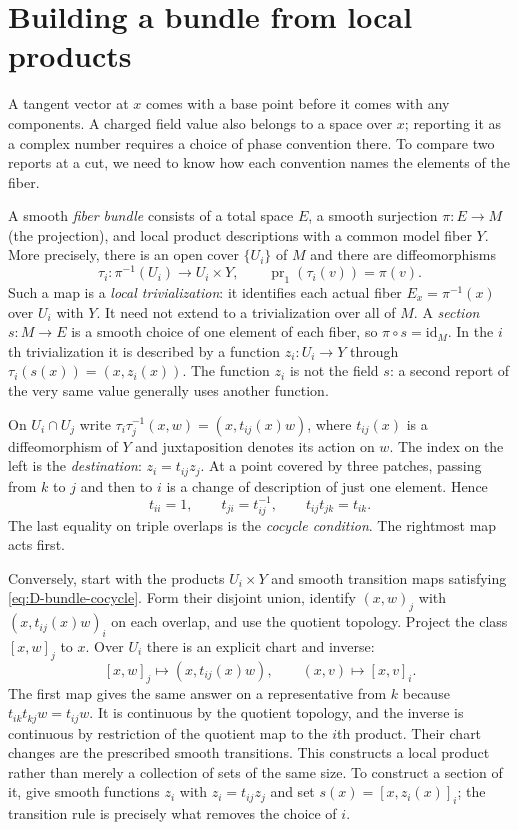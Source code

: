 \section{Building a bundle from local products}\label{sec:D-bundles}

A tangent vector at $x$ comes with a base point before it comes with any components. A charged field value also belongs to a space over $x$; reporting it as a complex number requires a choice of phase convention there. To compare two reports at a cut, we need to know how each convention names the elements of the fiber.

A smooth \emph{fiber bundle} consists of a total space $E$, a smooth surjection $\pi:E\to M$ (the projection), and local product descriptions with a common model fiber $Y$. More precisely, there is an open cover $\{U_i\}$ of $M$ and there are diffeomorphisms
\[
 \tau_i:\pi^{-1}(U_i)\longrightarrow U_i\times Y,
 \qquad \operatorname{pr}_1(\tau_i(v))=\pi(v) .
\]
Such a map is a \emph{local trivialization}: it identifies each actual fiber $E_x=\pi^{-1}(x)$ over $U_i$ with $Y$. It need not extend to a trivialization over all of $M$. A \emph{section} $s:M\to E$ is a smooth choice of one element of each fiber, so $\pi\circ s=\mathrm{id}_M$. In the $i$th trivialization it is described by a function $z_i:U_i\to Y$ through $\tau_i(s(x))=(x,z_i(x))$. The function $z_i$ is not the field $s$: a second report of the very same value generally uses another function.

On $U_i\cap U_j$ write $\tau_i\tau_j^{-1}(x,w)=(x,t_{ij}(x)w)$, where $t_{ij}(x)$ is a diffeomorphism of $Y$ and juxtaposition denotes its action on $w$. The index on the left is the \emph{destination}: $z_i=t_{ij}z_j$. At a point covered by three patches, passing from $k$ to $j$ and then to $i$ is a change of description of just one element. Hence
\begin{equation}
 t_{ii}=1,\qquad t_{ji}=t_{ij}^{-1},\qquad t_{ij}t_{jk}=t_{ik} .
 \label{eq:D-bundle-cocycle}
\end{equation}
The last equality on triple overlaps is the \emph{cocycle condition}. The rightmost map acts first.

Conversely, start with the products $U_i\times Y$ and smooth transition maps satisfying \eqref{eq:D-bundle-cocycle}. Form their disjoint union, identify $(x,w)_j$ with $(x,t_{ij}(x)w)_i$ on each overlap, and use the quotient topology. Project the class $[x,w]_j$ to $x$. Over $U_i$ there is an explicit chart and inverse:
\[
 [x,w]_j\longmapsto (x,t_{ij}(x)w),
 \qquad (x,v)\longmapsto [x,v]_i .
\]
The first map gives the same answer on a representative from $k$ because $t_{ik}t_{kj}w=t_{ij}w$. It is continuous by the quotient topology, and the inverse is continuous by restriction of the quotient map to the $i$th product. Their chart changes are the prescribed smooth transitions. This constructs a local product rather than merely a collection of sets of the same size. To construct a section of it, give smooth functions $z_i$ with $z_i=t_{ij}z_j$ and set $s(x)=[x,z_i(x)]_i$; the transition rule is precisely what removes the choice of $i$.

